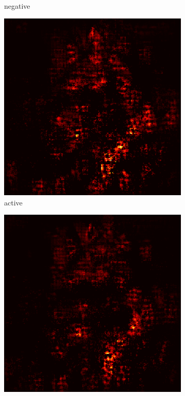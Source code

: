\documentclass[preprint,12pt]{elsarticle}
\begin{document}
\begin{figure}
\begin{subfigure}{0.14\textwidth}
        \caption{negative}
    \end{subfigure}
    \hfill
    \begin{subfigure}{0.14\textwidth}
        \centering
        \includegraphics[width=\linewidth]{../visualizations/examples/imagenette/cnn/active_saliency_map/8.png}
        \caption{active}
    \end{subfigure}
    \hfill
    \begin{subfigure}{0.14\textwidth}
        \centering
        \includegraphics[width=\linewidth]{../visualizations/examples/imagenette/cnn/inactive_saliency_map/8.png}

\end{subfigure}
\end{figure}
\end{document}

